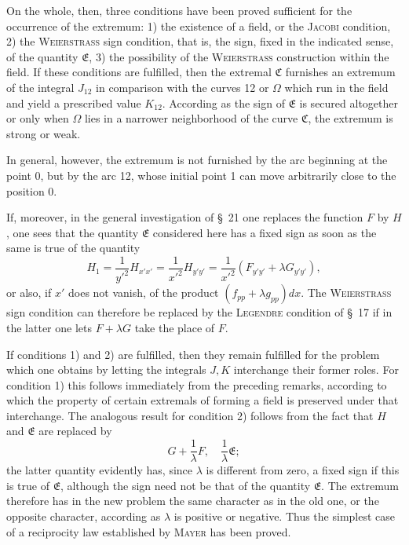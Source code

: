 \documentclass[11pt,a4paper,leqno]{article}
\begin{document}
On the whole, then, three conditions have been proved sufficient for the occurrence of the extremum: 1) the existence of a field, or the \textsc{Jacobi} condition, 2) the \textsc{Weierstrass} sign condition, that is, the sign, fixed in the indicated sense, of the quantity $\mathfrak{E}$, 3) the possibility of the \textsc{Weierstrass} construction within the field. If these conditions are fulfilled, then the extremal $\mathfrak{C}$ furnishes an extremum of the integral $J_{12}$ in comparison with the curves 12 or $\Omega$ which run in the field and yield a prescribed value $K_{12}$. According as the sign of $\mathfrak{E}$ is secured altogether or only when $\Omega$ lies in a narrower neighborhood of the curve $\mathfrak{C}$, the extremum is strong or weak.

In general, however, the extremum is not furnished by the arc beginning at the point 0, but by the
arc 12, whose initial point 1 can move arbitrarily close to the position 0.

If, moreover, in the general investigation of \S~21 one replaces the function $F$ by $H$, one sees that the quantity $\mathfrak{E}$ considered here has a fixed sign as soon as the same is true of the quantity
\[
H_1=\frac{1}{y'^2}H_{x'x'}=\frac{1}{x'^2}H_{y'y'}=
\frac{1}{x'^2}(F_{y'y'}+\lambda G_{y'y'}),
\]
or also, if $x'$ does not vanish, of the product $(f_{pp}+\lambda g_{pp})dx$. The \textsc{Weierstrass} sign condition can therefore be replaced by the \textsc{Legendre} condition of \S~17 if in the latter one lets $F+\lambda G$ take the place of $F$.

If conditions 1) and 2) are fulfilled, then they remain fulfilled for the problem which one obtains by letting the integrals $J,K$ interchange their former roles. For condition 1) this follows immediately from the preceding remarks, according to which the property of certain extremals of forming a field is preserved under that interchange. The analogous result for condition 2) follows from the fact that $H$ and $\mathfrak{E}$ are replaced by
\[
G+\frac{1}{\lambda}F,
\quad
\frac{1}{\lambda}\mathfrak{E};
\]
the latter quantity evidently has, since $\lambda$ is different from zero, a fixed sign if this is true of $\mathfrak{E}$, although the sign need not be that of the quantity $\mathfrak{E}$. The extremum therefore has in the new problem the same character as in the old one, or the opposite character, according as $\lambda$ is positive or negative. Thus the simplest case of a reciprocity law established by \textsc{Mayer} has been proved.
\end{document}

